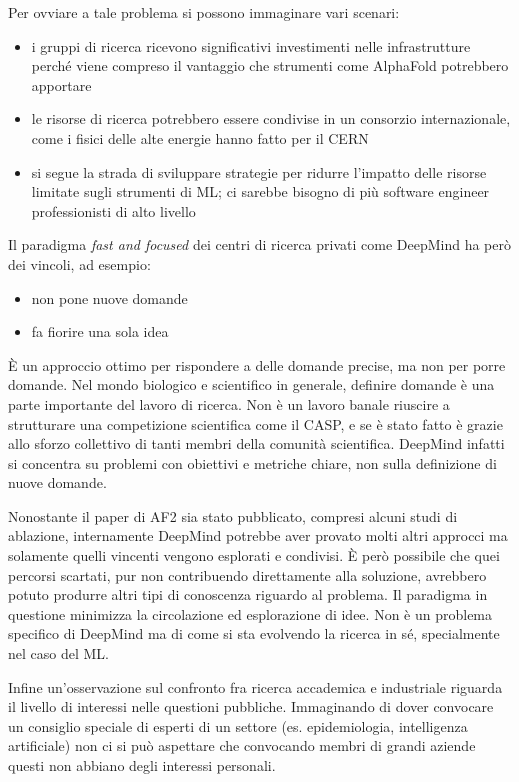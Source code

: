 {\par Per ovviare a tale problema si possono immaginare vari scenari\supercite{blopigAF}:
\begin{itemize}
	\item i gruppi di ricerca ricevono significativi investimenti nelle infrastrutture perché viene compreso il vantaggio che strumenti come AlphaFold potrebbero apportare
	\item le risorse di ricerca potrebbero essere condivise in un consorzio internazionale, come i fisici delle alte energie hanno fatto per il CERN
	\item si segue la strada di sviluppare strategie per ridurre l'impatto delle risorse limitate sugli strumenti di ML; ci sarebbe bisogno di più software engineer professionisti di alto livello
\end{itemize}

Il paradigma \textit{fast and focused} dei centri di ricerca privati come DeepMind ha però dei vincoli, ad esempio\supercite{moAlq}:
\begin{itemize}
	\item non pone nuove domande
	\item fa fiorire una sola idea
\end{itemize}

 È un approccio ottimo per rispondere a delle domande precise, ma non per porre domande. Nel mondo biologico e scientifico in generale, definire domande è una parte importante del lavoro di ricerca. Non è un lavoro banale riuscire a strutturare una competizione scientifica come il CASP, e se è stato fatto è grazie allo sforzo collettivo di tanti membri della comunità scientifica. DeepMind infatti si concentra su problemi con obiettivi e metriche chiare, non sulla definizione di nuove domande.

\par  Nonostante il paper di AF2 sia stato pubblicato, compresi alcuni studi di ablazione, internamente DeepMind potrebbe aver provato molti altri approcci ma solamente quelli vincenti vengono esplorati e condivisi. È però possibile che quei percorsi scartati, pur non contribuendo direttamente alla soluzione, avrebbero potuto produrre altri tipi di conoscenza riguardo al problema. Il paradigma in questione minimizza la circolazione ed esplorazione di idee. Non è un problema specifico di DeepMind ma di come si sta evolvendo la ricerca in sé, specialmente nel caso del ML.
 
 \par Infine un'osservazione sul confronto fra ricerca accademica e industriale riguarda il livello di interessi nelle questioni pubbliche. Immaginando di dover convocare un consiglio speciale di esperti di un settore (es. epidemiologia, intelligenza artificiale) non ci si può aspettare che convocando membri di grandi aziende questi non abbiano degli interessi personali.

}

\clearpage
